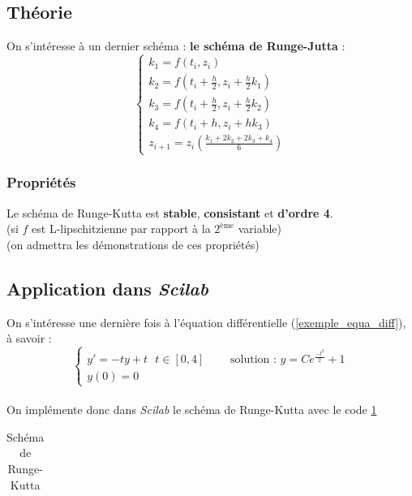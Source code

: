 \documentclass[a4paper,10pt]{report}
\begin{document}
\subsection{Théorie}
On s'intéresse à un dernier schéma : \textbf{le schéma de Runge-Jutta} :\\
\begin{equation}
\left\lbrace
\begin{array}{l}
k_1=f(t_i,z_i)\\
k_2=f \left( t_i + \frac{h}{2}, z_i+ \frac{h}{2}k_1 \right) \\
k_3=f \left( t_i + \frac{h}{2}, z_i+ \frac{h}{2}k_2 \right) \\
k_4=f \left( t_i + h, z_i+ hk_3 \right) \\
z_{i+1}=z_i\left( \frac{k_1+2k_2+2k_3+k_4}{6} \right)
\end{array}\right.
\end{equation}

\subsubsection{Propriétés}
Le schéma de Runge-Kutta est \textbf{stable}, \textbf{consistant} et \textbf{d'ordre 4}.\\
(si $f$ est L-lipschitzienne par rapport à la $2^{\text{ème}}$ variable)  \\
(on admettra les démonstrations de ces propriétés)

\subsection{Application dans \textit{Scilab}}
On s'intéresse une dernière fois à l'équation différentielle (\ref{exemple_equa_diff}), à savoir :\\
\begin{equation*}
\left\lbrace
\begin{array}{lll}
y'=-ty+t \ \ \ t \in [0,4] & \text{    } & \text{solution : }y=Ce^{\frac{-t^2}{2}}+1 \\
y(0)=0
\end{array}\right.
\end{equation*} \\
On implémente donc dans \textit{Scilab} le schéma de Runge-Kutta avec le code \ref{code_rungekutta}
\begin{table}[H]
\caption{Schéma de Runge-Kutta}
\begin{tabular}{l}

\label{code_rungekutta}
\end{tabular}
\end{table}
\end{document}
